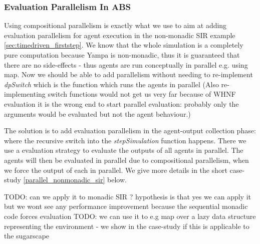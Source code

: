 \subsubsection{Evaluation Parallelism In ABS}
Using compositional parallelism is exactly what we use to aim at adding evaluation parallelism for agent execution in the non-monadic SIR example \ref{sec:timedriven_firststep}. We know that the whole simulation is a completely pure computation because Yampa is non-monadic, thus it is guaranteed that there are no side-effects - thus agents are run conceptually in parallel e.g. using map. Now we should be able to add parallelism without needing to re-implement \textit{dpSwitch} which is the function which runs the agents in parallel (Also re-implementing switch functions would not get us very far because of WHNF evaluation it is the wrong end to start parallel evaluation: probably only the arguments would be evaluated but not the agent behaviour.)

The solution is to add evaluation parallelism in the agent-output collection phase: where the recursive switch into the \textit{stepSimulation} function happens. There we use a evaluation strategy to evaluate the outputs of all agents in parallel. The agents will then be evaluated in parallel due to compositional parallelism, when we force the output of each in parallel. We give more details in the short case-study \ref{parallel_nonmonadic_sir} below.

TODO: can we apply it to monadic SIR ? hypothesis is that yes we can apply it but we wont see any performance improvement because the sequential monadic code forces evaluation
TODO: we can use it to e.g map over a lazy data structure representing the environment - we show in the case-study if this is applicable to the sugarscape
